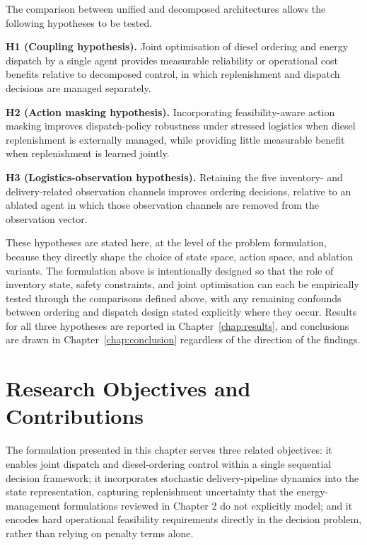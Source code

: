 The comparison between unified and decomposed architectures allows the
following hypotheses to be tested.

\textbf{H1 (Coupling hypothesis).} Joint optimisation of diesel ordering and
energy dispatch by a single agent provides measurable reliability or
operational cost benefits relative to decomposed control, in which
replenishment and dispatch decisions are managed separately.


\textbf{H2 (Action masking hypothesis).} Incorporating feasibility-aware
action masking improves dispatch-policy robustness under stressed logistics when diesel
replenishment is externally managed, while providing little measurable
benefit when replenishment is learned jointly.

\textbf{H3 (Logistics-observation hypothesis).} Retaining the five
inventory- and delivery-related observation channels improves ordering
decisions, relative to an ablated
agent in which those observation channels are
removed from the observation vector.

These hypotheses are stated here, at the level of the problem formulation,
because they directly shape the choice of state space, action space, and
ablation variants. The formulation above is intentionally designed so that
the role of inventory state, safety constraints, and joint optimisation can
each be empirically tested through the comparisons defined above, with
any remaining confounds between ordering and dispatch design stated
explicitly where they occur.
Results for all three hypotheses are reported in Chapter~\ref{chap:results},
and conclusions are drawn in Chapter~\ref{chap:conclusion} regardless of the
direction of the findings.

\section{Research Objectives and Contributions}
\label{sec:objectives}

The formulation presented in this chapter serves three related objectives:
it enables joint dispatch and diesel-ordering control within a single
sequential decision framework; it incorporates stochastic delivery-pipeline
dynamics into the state representation, capturing replenishment uncertainty
that the energy-management formulations reviewed in Chapter 2 do not explicitly model; and it encodes
hard operational feasibility requirements directly in the decision problem,
rather than relying on penalty terms alone.

